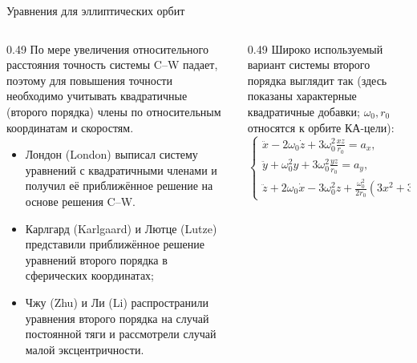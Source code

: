 \documentclass[8pt]{beamer}
\begin{document}
\begin{frame}{Уравнения для эллиптических орбит}
\begin{columns}[T,totalwidth=\textwidth]
  \begin{column}{0.49\textwidth}
    По мере увеличения относительного расстояния точность системы C–W падает, поэтому для повышения точности необходимо учитывать квадратичные (второго порядка) члены по относительным координатам и скоростям.
    \begin{itemize}
        \item Лондон (London) \cite{london1963second} выписал систему уравнений с квадратичными членами и получил её приближённое решение на основе решения C–W.
        \item Карлгард (Karlgaard) и Лютце (Lutze) \cite{karlgaard2003second} представили приближённое решение уравнений второго порядка в сферических координатах;
        \item Чжу (Zhu) и Ли (Li) распространили уравнения второго порядка на случай постоянной тяги и рассмотрели случай малой эксцентричности.
    \end{itemize}
  \end{column}

  \begin{column}{0.49\textwidth}
    Широко используемый вариант системы второго порядка выглядит так \cite{london1963second} (здесь показаны характерные квадратичные добавки; $\omega_0, r_0$ относятся к орбите КА-цели):
    \begin{equation*}
        \begin{cases}
            \ddot{x} - 2 \omega_0 \dot{z} + 3 \omega_0^2 \frac{xz}{r_0} = a_x, \\
            \ddot{y} + \omega_0^2 y + 3 \omega_0^2 \frac{yz}{r_0} = a_y, \\
            \ddot{z} + 2 \omega_0 \dot{x} - 3 \omega_0^2 z + \frac{\omega_0^2}{2 r_0} (3 x^2 + 3 y^2 + 6 z^2) = a_z.
        \end{cases}
    \end{equation*}
  \end{column}
\end{columns}
\end{frame}
\end{document}
